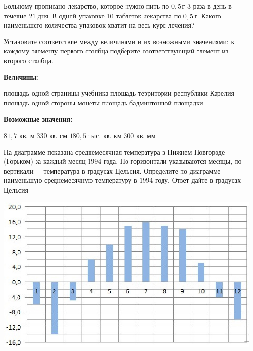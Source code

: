 %
%
\begin{training}[1]
	\begin{listofex}
	\item Больному прописано лекарство, которое нужно пить по \(0,5\) г \(3\) раза в день в течение \(21\) дня. В одной упаковке \(10\) таблеток лекарства по \(0,5\) г. Какого наименьшего количества упаковок хватит на весь курс лечения?
	\item Установите соответствие между величинами и их возможными значениями: к каждому элементу первого столбца подберите соответствующий элемент из второго столбца. \\
	\begin{minipage}[t]{0.58\linewidth}
		\textbf{Величины:}
		\begin{tasks}
			\task площадь одной страницы учебника
			\task площадь территории республики Карелия
			\task площадь одной стороны монеты
			\task площадь бадминтонной площадки
		\end{tasks}
	\end{minipage}
	\hspace{0.05\linewidth}
	\begin{minipage}[t]{\textwidth}
		\textbf{Возможные значения:}
		\begin{tasks}
			\task \(81,7\) кв. м
			\task \(330\) кв. см
			\task \(180,5\) тыс. кв. км
			\task \(300\) кв. мм
		\end{tasks}
	\end{minipage}
	\item На диаграмме показана среднемесячная температура в Нижнем Новгороде (Горьком) за каждый месяц \(1994\) года. По горизонтали указываются месяцы, по вертикали --- температура в градусах Цельсия. Определите по диаграмме наименьшую среднемесячную температуру в \(1994\) году. Ответ дайте в градусах Цельсия
	\begin{minipage}[t]{\linewidth}
		\includegraphics[align=t, width=\linewidth]{../pics/G101M8H3-3}

\end{minipage}
\end{listofex}
\end{training}

